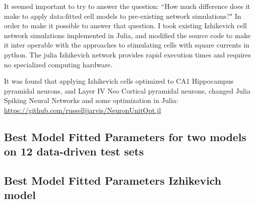 It seemed important to try to answer the question: ``How much difference does it make to apply data-fitted cell models to pre-existing network simulations?" In order to make it possible to answer that question. I took existing Izhikevich cell network simulations implemented in Julia, and modified the source code to make it inter operable with the approaches to stimulating cells with square currents in python. The julia Izhikevich network provides rapid execution times and requires no specialized computing hardware.

It was found that applying Izhikevich cells optimized to CA1 Hippocampus pyramidal neurons, and Layer IV Neo Cortical pyramidal neurons, changed 
Julia Spiking Neural Networks and some optimization in Julia:
\url{https://github.com/russelljjarvis/NeuronUnitOpt.jl}


\subsection{Best Model Fitted Parameters for two models on 12 data-driven test sets}

\subsection{Best Model Fitted Parameters Izhikevich model}

\newpage


